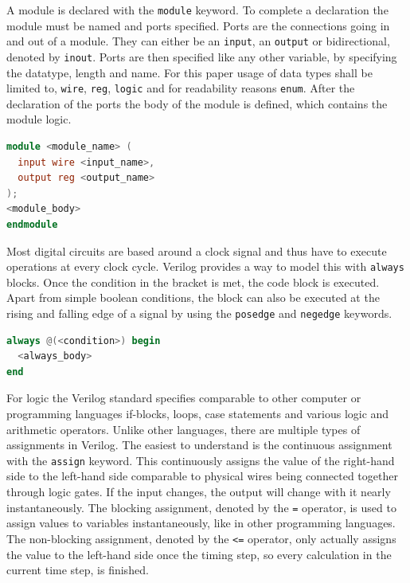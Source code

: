 A module is declared with the \texttt{module} keyword. To complete a declaration the module must be named and ports specified. Ports are the connections going in and out of a module. They can either be an \texttt{input}, an \texttt{output} or bidirectional, denoted by \texttt{inout}. Ports are then specified like any other variable, by specifying the datatype, length and name. For this paper usage of data types shall be limited to, \texttt{wire}, \texttt{reg}, \texttt{logic} and for readability reasons \texttt{enum}. After the declaration of the ports the body of the module is defined, which contains the module logic.

\begin{lstlisting}[language=Verilog, caption=Module definition]
module <module_name> (
  input wire <input_name>,
  output reg <output_name>
);
<module_body>
endmodule
\end{lstlisting}


Most digital circuits are based around a clock signal and thus have to execute operations at every clock cycle. Verilog provides a way to model this with \texttt{always} blocks. Once the condition in the bracket is met, the code block is executed. Apart from simple boolean conditions, the block can also be executed at the rising and falling edge of a signal by using the \texttt{posedge} and \texttt{negedge} keywords.

\begin{lstlisting}[language=Verilog, caption=Always block definition]
always @(<condition>) begin
  <always_body>
end

\end{lstlisting}

For logic the Verilog standard specifies comparable to other computer or programming languages if-blocks, loops, case statements and various logic and arithmetic operators. Unlike other languages, there are multiple types of assignments in Verilog. The easiest to understand is the continuous assignment with the \texttt{assign} keyword. This continuously assigns the value of the right-hand side to the left-hand side comparable to physical wires being connected together through logic gates. If the input changes, the output will change with it nearly instantaneously. The blocking assignment, denoted by the \texttt{=} operator, is used to assign values to variables instantaneously, like in other programming languages. The non-blocking assignment, denoted by the \texttt{<=} operator, only actually assigns the value to the left-hand side once the timing step, so every calculation in the current time step, is finished. 

